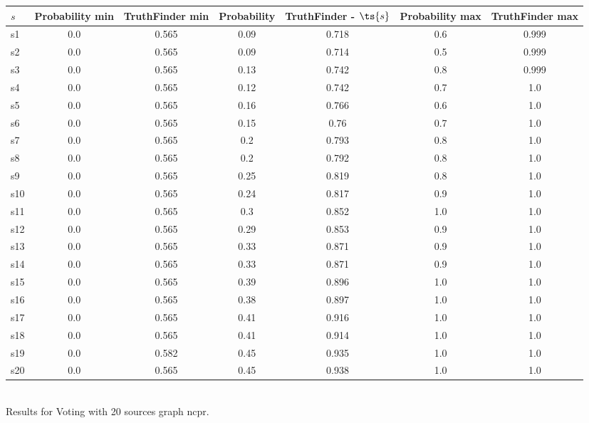 \documentclass{article}
\begin{document}
\noindent\begin{tabular}{|l|c|c|c|c|c|c|}
\hline
$s$& Probability min & TruthFinder min & Probability & TruthFinder - $\ts{s}$ & Probability max & TruthFinder max\\
\hline
s1 &0.0 & 0.565 & 0.09 & 0.718 & 0.6 & 0.999\\
\hline
s2 &0.0 & 0.565 & 0.09 & 0.714 & 0.5 & 0.999\\
\hline
s3 &0.0 & 0.565 & 0.13 & 0.742 & 0.8 & 0.999\\
\hline
s4 &0.0 & 0.565 & 0.12 & 0.742 & 0.7 & 1.0\\
\hline
s5 &0.0 & 0.565 & 0.16 & 0.766 & 0.6 & 1.0\\
\hline
s6 &0.0 & 0.565 & 0.15 & 0.76 & 0.7 & 1.0\\
\hline
s7 &0.0 & 0.565 & 0.2 & 0.793 & 0.8 & 1.0\\
\hline
s8 &0.0 & 0.565 & 0.2 & 0.792 & 0.8 & 1.0\\
\hline
s9 &0.0 & 0.565 & 0.25 & 0.819 & 0.8 & 1.0\\
\hline
s10 &0.0 & 0.565 & 0.24 & 0.817 & 0.9 & 1.0\\
\hline
s11 &0.0 & 0.565 & 0.3 & 0.852 & 1.0 & 1.0\\
\hline
s12 &0.0 & 0.565 & 0.29 & 0.853 & 0.9 & 1.0\\
\hline
s13 &0.0 & 0.565 & 0.33 & 0.871 & 0.9 & 1.0\\
\hline
s14 &0.0 & 0.565 & 0.33 & 0.871 & 0.9 & 1.0\\
\hline
s15 &0.0 & 0.565 & 0.39 & 0.896 & 1.0 & 1.0\\
\hline
s16 &0.0 & 0.565 & 0.38 & 0.897 & 1.0 & 1.0\\
\hline
s17 &0.0 & 0.565 & 0.41 & 0.916 & 1.0 & 1.0\\
\hline
s18 &0.0 & 0.565 & 0.41 & 0.914 & 1.0 & 1.0\\
\hline
s19 &0.0 & 0.582 & 0.45 & 0.935 & 1.0 & 1.0\\
\hline
s20 &0.0 & 0.565 & 0.45 & 0.938 & 1.0 & 1.0\\
\hline
\end{tabular}\\

\noindent Results for Voting with 20 sources graph ncpr.
\end{document}
